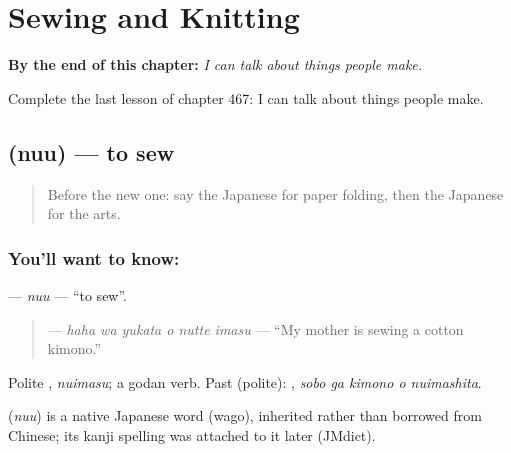 
\chapter{Sewing and Knitting}
\label{ch:ja-sewing-and-knitting}

\begin{chapteropening}
\textbf{By the end of this chapter:} \emph{I can talk about things people make.}

Complete the last lesson of chapter 467: I can talk about things people make.
\end{chapteropening}

\section[\texorpdfstring{\ja{ぬう} (nuu)}{ぬう (nuu)}]{ (nuu) — to sew}

\label{lesson:JA-C467-nuu}



\begin{quote}
Before the new one: say the Japanese for paper folding, then the Japanese for the arts.
\end{quote}

\subsection*{You'll want to know: }
\textbf{} — \emph{nuu} — \textquotedblleft{}to sew\textquotedblright{}.

\begin{quote}
\textbf{  } — \emph{haha wa yukata o nutte imasu} — \textquotedblleft{}My mother is sewing a cotton kimono.\textquotedblright{}
\end{quote}

Polite \textbf{}, \emph{nuimasu}; a godan verb. Past (polite): \textbf{  }, \emph{sobo ga kimono o nuimashita}.

\begin{cousinweb}
\textbf{} (\emph{nuu}) is a native Japanese word (wago), inherited rather than borrowed from Chinese; its kanji spelling was attached to it later (JMdict).
\end{cousinweb}

